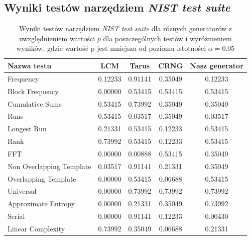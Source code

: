 \subsection{Wyniki testów narzędziem \textit{NIST test suite}}
\begin{table}[!ht]
    \centering
    \begin{tabular}{|l|c|c|c|c|}
    \hline
        \textbf{Nazwa testu} & \textbf{LCM} & \textbf{Tarus} & \textbf{CRNG} & \textbf{Nasz generator} \\ \hline
        Frequency & 0.12233 & 0.91141 & 0.35049 & 0.12233 \\ \hline
        Block Frequency & \cellcolor{lred}0.00000 & 0.53415 & 0.53415 & 0.53415 \\ \hline
        Cumulative Sums & 0.53415 & 0.73992 & 0.35049 & 0.35049 \\ \hline
        Runs & 0.53415 & \cellcolor{lred}0.03517 & 0.35049 & \cellcolor{lred}0.03517 \\ \hline
        Longest Run & 0.21331 & 0.53415 & 0.12233 & 0.53415 \\ \hline
        Rank & 0.73992 & 0.53415 & 0.12233 & 0.53415 \\ \hline
        FFT & \cellcolor{lred}0.00000 & \cellcolor{lred}0.00888 & 0.53415 & 0.35049 \\ \hline
        Non Overlapping Template & \cellcolor{lred}0.03517 & 0.91141 & 0.21331 & 0.35049 \\ \hline
        Overlapping Template & \cellcolor{lred}0.00000 & 0.53415 & 0.06688 & 0.53415 \\ \hline
        Universal & \cellcolor{lred}0.00000 & 0.73992 & 0.73992 & 0.73992 \\ \hline
        Approximate Entropy & \cellcolor{lred}0.00000 & 0.21331 & 0.35049 & 0.73992 \\ \hline
        Serial & \cellcolor{lred}0.00000 & 0.91141 & 0.12233 & \cellcolor{lred}0.00430 \\ \hline
        Linear Complexity & 0.73992 & 0.35049 & 0.06688 & 0.21331 \\ \hline
    \end{tabular}
    \caption{\label{tab:nist}  Wyniki testów narzędziem \emph{NIST test suite}
 \cite{NISTTests} dla różnych generatorów z uwzględnieniem wartości $p$ dla poszczególnych testów i wyróżnieniem wyników, gdzie wartość p jest mniejsza od poziomu istotności $\alpha = 0.05$}
\end{table}
